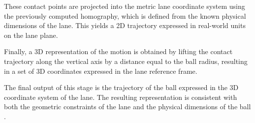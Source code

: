 These contact points are projected into the metric lane coordinate system using the previously computed homography, which is defined from the known physical dimensions of the lane. This yields a 2D trajectory expressed in real-world units on the lane plane.

Finally, a 3D representation of the motion is obtained by lifting the contact trajectory along the vertical axis by a distance equal to the ball radius, resulting in a set of 3D coordinates expressed in the lane reference frame.

The final output of this stage is the trajectory of the ball expressed in the 3D coordinate system of the lane. The resulting representation is consistent with both the geometric constraints of the lane and the physical dimensions of the ball \cite{dimensionscom2024balldimensions}.

